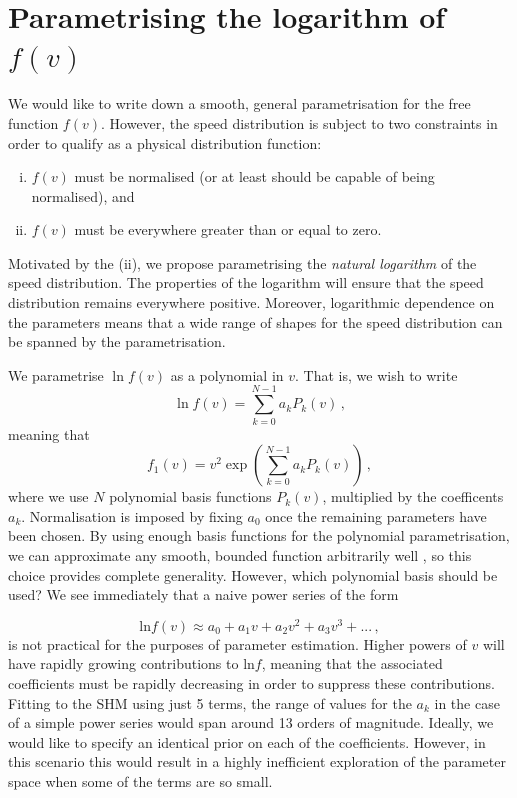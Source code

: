 \section{Parametrising the logarithm of $f(v)$}
\label{sec:Poly:parametrisation}

We would like to write down a smooth, general parametrisation for the free function $f(v)$. However, the speed distribution is subject to two constraints in order to qualify as a physical distribution function:
\begin{enumerate}[(i)]
\item $f(v)$ must be normalised (or at least should be capable of being normalised), and
\item $f(v)$ must be everywhere greater than or equal to zero.
\end{enumerate}
Motivated by the (ii), we propose parametrising the \textit{natural logarithm} of the speed distribution. The properties of the logarithm will ensure that the speed distribution remains everywhere positive. Moreover, logarithmic dependence on the parameters means that a wide range of shapes for the speed distribution can be spanned by the parametrisation. 

We parametrise $\ln f(v)$ as a polynomial in $v$. That is, we wish to write
\begin{equation}
\ln f(v) = \sum_{k = 0}^{N-1} a_k P_k(v)\,,
\end{equation}
meaning that
\begin{equation}
f_1(v) = v^2 \exp\left( \sum_{k = 0}^{N-1} a_k P_k(v)\right)\,,
\end{equation}
where we use $N$ polynomial basis functions $P_k(v)$, multiplied by the coefficents $a_k$. Normalisation is imposed by fixing $a_0$ once the remaining parameters have been chosen. By using enough basis functions for the polynomial parametrisation, we can approximate any smooth, bounded function arbitrarily well \cite{}, so this choice provides complete generality. However, which polynomial basis should be used? We see immediately that a naive power series of the form

\begin{equation}
\textrm{ln}f(v) \approx a_0 + a_1 v + a_2 v^2 + a_3 v^3 + ...\,,
\end{equation}
is not practical for the purposes of parameter estimation. Higher powers of $v$ will have rapidly growing contributions to $\textrm{ln} f$, meaning that the associated coefficients must be rapidly decreasing in order to suppress these contributions. Fitting to the SHM using just 5 terms, the range of values for the $a_k$ in the case of a simple power series would span around 13 orders of magnitude. Ideally, we would like to specify an identical prior on each of the coefficients. However, in this scenario this would result in a highly inefficient exploration of the parameter space when some of the terms are so small.

